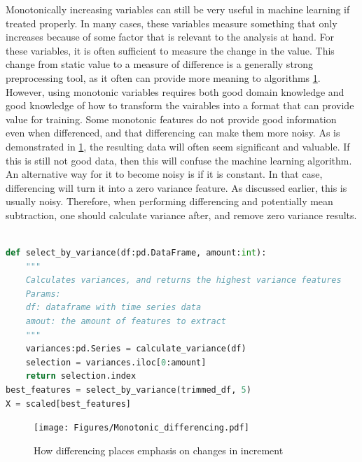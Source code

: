 Monotonically increasing variables can still be very useful in machine learning if treated properly.
In many cases, these variables measure something that only increases because of some factor that is relevant to the analysis at hand.
For these variables, it is often sufficient to measure the change in the value.
This change from static value to a measure of difference is a generally strong preprocessing tool, as it often can provide more meaning to algorithms \ref*{Differencing}.
However, using monotonic variables requires both good domain knowledge and good knowledge of how to transform the vairables into a format that can provide value for training.
Some monotonic features do not provide good information even when differenced, and that differencing can make them more noisy. As is demonstrated in \ref*{Differencing}, the resulting data will often seem significant and valuable.
If this is still not good data, then this will confuse the machine learning algorithm. \\
An alternative way for it to become noisy is if it is constant. In that case, differencing will turn it into a zero variance feature. As discussed earlier, this is usually noisy.
Therefore, when performing differencing and potentially mean subtraction, one should calculate variance after, and remove zero variance results.


\begin{lstlisting}[language=Python]
    
def select_by_variance(df:pd.DataFrame, amount:int):
    """
    Calculates variances, and returns the highest variance features
    Params:
    df: dataframe with time series data
    amout: the amount of features to extract
    """
    variances:pd.Series = calculate_variance(df)
    selection = variances.iloc[0:amount]
    return selection.index
best_features = select_by_variance(trimmed_df, 5)
X = scaled[best_features]
\end{lstlisting}

\begin{figure}[ht]
    \centering
    \texttt{[image: Figures/Monotonic\_differencing.pdf]}
    \caption{How differencing places emphasis on changes in increment}
    \label{Differencing}
\end{figure}

